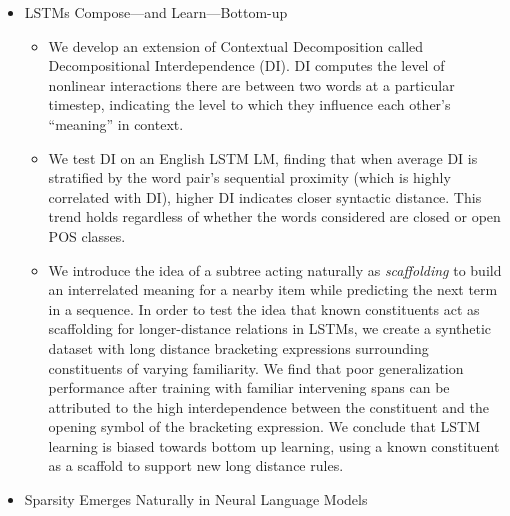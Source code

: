 \begin{itemize}
\begin{itemize}
    \end{itemize}
    \item LSTMs Compose---and Learn---Bottom-up
    \begin{itemize}
        \item We develop an extension of Contextual Decomposition called Decompositional Interdependence (DI). DI computes the level of nonlinear interactions there are between two words at a particular timestep, indicating the level to which they influence each other's ``meaning'' in context.
        \item We test DI on an English LSTM LM, finding that when average DI is stratified by the word pair's sequential proximity (which is highly correlated with  DI), higher DI indicates closer syntactic distance. This trend holds regardless of whether the words considered are closed or open POS classes.
        \item We introduce the idea of a subtree acting naturally as \textit{scaffolding} to build an interrelated meaning for a nearby item while predicting the next term in a sequence.
        In order to test the idea that known constituents act as scaffolding for longer-distance relations in LSTMs, we create a synthetic dataset with long distance bracketing expressions surrounding constituents of varying familiarity.
        We find that poor generalization performance after training with familiar intervening spans can be attributed to the high interdependence between the constituent and the opening symbol of the bracketing expression.
        We conclude that LSTM learning is biased towards bottom up learning, using a known constituent as a scaffold to support new long distance rules.
    \end{itemize}
    \item Sparsity Emerges Naturally in Neural Language Models
    \begin{itemize}
        

\end{itemize}
\end{itemize}
